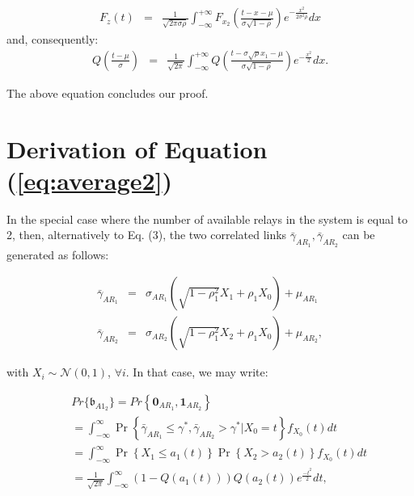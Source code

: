 \documentclass[12pt,draftcls, onecolumn]{IEEEtran}
\begin{document}
\begingroup
\begin{eqnarray}
F_z(t) &=& \frac{1}{\sqrt{2\pi \sigma \rho}}\int^{+\infty}_{-\infty}F_{x_2}\left(\frac{t-x-\mu}{ \sigma \sqrt{1-\rho} }\right)e^{-\frac{x^2}{2\sigma^2 \rho}} dx
\end{eqnarray}
\endgroup
and, consequently:
\begingroup
\begin{eqnarray}
Q\left(\frac{t-\mu}{ \sigma }\right) &=&\frac{1}{\sqrt{2\pi}}\int^{+\infty}_{-\infty}Q\left(\frac{t-\sigma\sqrt{\rho}x_1-\mu}{ \sigma \sqrt{1-\rho} }\right)e^{-\frac{x^2}{2}}dx.
\end{eqnarray}
\endgroup

\noindent The above equation concludes our proof.

\section{Derivation of Equation (\ref{eq:average2})}
\label{a5}

In the special case where the number of available relays in the system is equal to 2, then, alternatively to Eq. (3), the two correlated links $\bar{\gamma}_{AR_{1}}, \bar{\gamma}_{AR_{2}}$ can be generated as follows:

\begingroup
{\setlength{\arraycolsep}{0em}
\begin{eqnarray}
\bar{\gamma}_{AR_{1}} &=& \sigma_{AR_{1}} \left(\sqrt{1-\rho_1^2}X_1+\rho_1 X_0\right)+\mu_{AR_{1}}\label{Rvs}\\
\bar{\gamma}_{AR_{2}} &=& \sigma_{AR_{2}} \left(\sqrt{1-\rho_1^2}X_2+\rho_1 X_0\right)+\mu_{AR_{2}}\label{Rvs2},
\end{eqnarray}}
\endgroup

\noindent with $X_i\sim \mathcal{N}(0,1)$, $\forall i$. In that case, we may write:

\begingroup
{\setlength{\arraycolsep}{0em}
\begin{eqnarray}
&&Pr\{\mathfrak{b}_{A1_2}\} = Pr\left\{\boldsymbol{0}_{AR_1},\boldsymbol{1}_{AR_2}\right\}\nonumber\\
&& = \int^{\infty}_{-\infty}\Pr\left\{\bar{\gamma}_{AR_{1}}\leq \gamma^*,\bar{\gamma}_{AR_{2}}> \gamma^*\left|X_0=t\right.\right\}f_{X_0}\left(t\right)dt\nonumber\\
&& = \int^{\infty}_{-\infty}\Pr\left\{X_1\leq a_1(t)\right\}\Pr\left\{X_2> a_2(t)\right\}f_{X_0}\left(t\right)dt\nonumber\\
&& = \frac{1}{\sqrt{2\pi}}\int^{\infty}_{-\infty}\left(1-Q\left(a_{1}\left(t\right)\right)\right) Q\left(a_{2}\left(t\right)\right)e^{\frac{-t^2}{2}}dt, \label{A1}
\end{eqnarray}}
\endgroup
\end{document}
